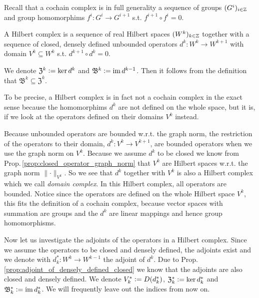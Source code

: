\documentclass[../master_thesis.tex]{subfiles}
\begin{document}
Recall that a cochain complex 
is in full generality a sequence of groups $(G^i)_{i\in \mathbb{Z}}$ 
and group homomorphims $f^i: G^i \rightarrow G^{i+1}$ s.t. 
$f^{i+1} \circ f^{i} = 0$.

\begin{definition}
    A Hilbert complex is a sequence of real Hilbert spaces $(W^k)_{k\in \mathbb{Z}}$
    together with a sequence of closed, densely defined 
    unbounded operators $d^k: W^k \rightarrow W^{k+1}$ with domain
    $V^k \subseteq W^k$ s.t. $d^{k+1} \circ d^k = 0$.
\end{definition}
\noindent We denote $\mathfrak{Z}^k  \vcentcolon= \ker d^k$ and $\mathfrak{B}^k 
\vcentcolon= \operatorname{im} d^{k-1}$. Then it follows from the definition that
$\mathfrak{B}^k \subseteq \mathfrak{Z}^k$. 

To be precise, a Hilbert complex is in fact not a cochain complex in the exact 
sense because the homomorphims $d^k$ are not defined on the whole space, but it is, if we look at
the operators defined on their domains $V^k$ instead.

Because unbounded operators are bounded w.r.t. the graph norm,
the restriction of the operators to their domain,
$d^k: V^k \rightarrow V^{k+1}$, are bounded operators when we use the graph norm
on $V^k$. 
Because we assume $d^k$ to be 
closed we know from Prop.\,\ref{prop:closed_operator_graph_norm}
that $V^k$ are Hilbert spaces w.r.t. the graph norm $\lVert \cdot \rVert _{V^k}$.
So we see that $d^k$ together with $V^k$ is also a Hilbert complex which 
we call \textit{domain complex}. In this Hilbert complex, all operators are 
bounded. Notice since the operators are defined on the whole Hilbert space 
$V^k$, this fits the definition of a cochain complex, because vector spaces 
with summation
are groups and the $d^k$ are linear mappings and hence group homomorphisms.

Now let us investigate the adjoints of the operators in a Hilbert complex.
Since we assume the operators to be closed and densely defined, the adjoints 
exist and we denote with $d_k^*:W^k \rightarrow W^{k-1}$ the adjoint of $d^k$.
Due to Prop.\,\ref{prop:adjoint_of_densely_defined_closed} we know that the 
adjoints are also closed and densely defined. We denote 
$V_k^* \vcentcolon= D(d_k^*)$, $\mathfrak{Z}^*_k \vcentcolon= \ker d^*_k$ 
and $\mathfrak{B}^*_k \vcentcolon= \operatorname{im} d^*_k$. We will frequently leave out 
the indices from now on.
\end{document}

